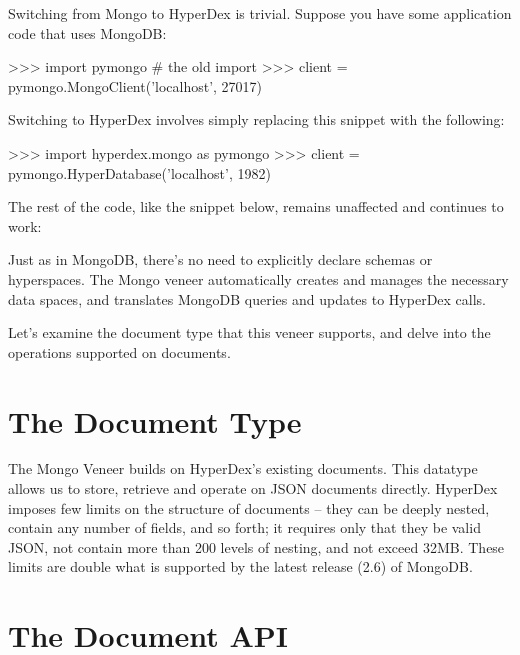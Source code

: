 Switching from Mongo to HyperDex is trivial. Suppose you have some
application code that uses MongoDB:

\begin{pythoncode}
>>> import pymongo # the old import
>>> client = pymongo.MongoClient('localhost', 27017)
\end{pythoncode}

Switching to HyperDex involves simply replacing this snippet with the following:

\begin{pythoncode}
>>> import hyperdex.mongo as pymongo
>>> client = pymongo.HyperDatabase('localhost', 1982)
\end{pythoncode}

The rest of the code, like the snippet below, remains unaffected and continues to work:


Just as in MongoDB, there's no need to explicitly declare schemas or
hyperspaces. The Mongo veneer automatically creates and manages the necessary
data spaces, and translates MongoDB queries and updates to HyperDex calls. 

Let's examine the document type that this veneer supports, and delve into the
operations supported on documents.

\section{The Document Type}

The Mongo Veneer builds on HyperDex's existing documents. This datatype allows
us to store, retrieve and operate on JSON documents directly.  HyperDex imposes
few limits on the structure of documents -- they can be deeply nested, contain
any number of fields, and so forth; it requires only that they be valid JSON,
not contain more than 200 levels of nesting, and not exceed 32MB.  These limits
are double what is supported by the latest release (2.6) of MongoDB.

\section{The Document API}

